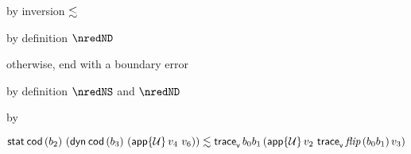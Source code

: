 {\begin{lamportproof*}
    \begin{pfproof}
        \begin{pfproof}
          by inversion $\lesssim$
        \end{pfproof}
        \begin{pfproof}
          by definition $\nredND$
        \end{pfproof}
        \begin{pfproof}
          otherwise, end with a boundary error
        \end{pfproof}
        \begin{pfproof}
          by definition $\nredNS$ and $\nredND$
        \end{pfproof}
        \begin{pfproof}
          by 
        \end{pfproof}
      \qedstep
        \begin{pfproof}
          $\mathsf{stat}^{}\,\mathsf{cod}\,(b_2)~(\mathsf{dyn}^{}\,\mathsf{cod}\,(b_3)~(\mathsf{app}{\{{\mathcal U}\}}\,v_4~v_6)) \lesssim \mathsf{trace}_{\mathsf{v}}^{}\,b_0  b_1\,(\mathsf{app}{\{{\mathcal U}\}}\,v_2~\mathsf{trace}_{\mathsf{v}}^{}\,\textit{flip}\,(b_0  b_1)\,v_3)$
        \end{pfproof}
    \end{pfproof}


\end{lamportproof*}}

